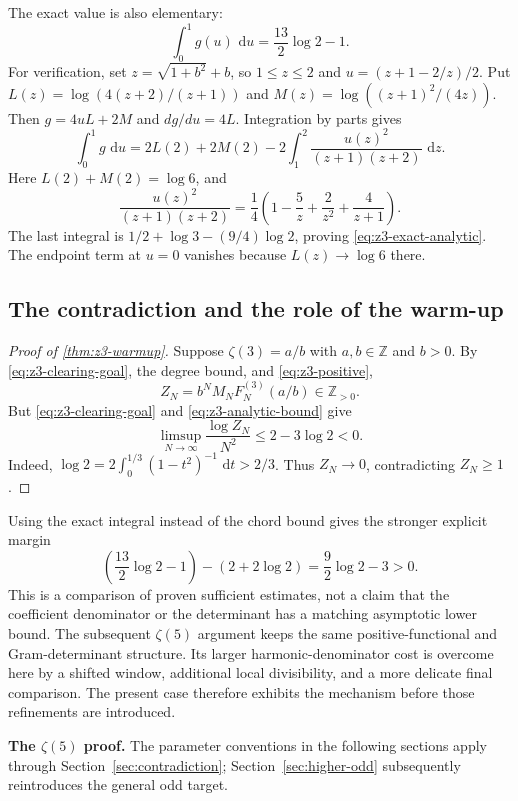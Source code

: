 \documentclass[11pt,letterpaper]{article}
\theoremstyle{definition}
\newcommand{\Z}{\mathbb Z}
\newcommand{\dd}{\,\mathrm d}
\begin{document}
The exact value is also elementary:
\begin{equation}\label{eq:z3-exact-analytic}
 \int_0^1g(u)\,\dd u=\frac{13}{2}\log2-1.
\end{equation}
For verification, set $z=\sqrt{1+b^2}+b$, so $1\le z\le2$ and
$u=(z+1-2/z)/2$. Put
$L(z)=\log(4(z+2)/(z+1))$ and
$M(z)=\log((z+1)^2/(4z))$. Then $g=4uL+2M$ and $dg/du=4L$.
Integration by parts gives
\[
 \int_0^1g\,\dd u
 =2L(2)+2M(2)
 -2\int_1^2\frac{u(z)^2}{(z+1)(z+2)}\,\dd z.
\]
Here $L(2)+M(2)=\log6$, and
\[
 \frac{u(z)^2}{(z+1)(z+2)}
 =\frac14\left(1-\frac5z+\frac2{z^2}+\frac4{z+1}\right).
\]
The last integral is $1/2+\log3-(9/4)\log2$, proving
\eqref{eq:z3-exact-analytic}. The endpoint term at $u=0$ vanishes
because $L(z)\to\log6$ there.

\subsection{The contradiction and the role of the warm-up}

\begin{proof}[Proof of \cref{thm:z3-warmup}]
Suppose $\zeta(3)=a/b$ with $a,b\in\Z$ and $b>0$.
By \eqref{eq:z3-clearing-goal}, the degree bound, and
\eqref{eq:z3-positive},
\[
 Z_N=b^NM_NF_N^{(3)}(a/b)\in\Z_{>0}.
\]
But \eqref{eq:z3-clearing-goal} and \eqref{eq:z3-analytic-bound} give
\[
 \limsup_{N\to\infty}\frac{\log Z_N}{N^2}
 \le2-3\log2<0.
\]
Indeed,
$\log2=2\int_0^{1/3}(1-t^2)^{-1}\,\dd t>2/3$.
Thus $Z_N\to0$, contradicting $Z_N\ge1$.
\end{proof}

Using the exact integral instead of the chord bound gives the stronger
explicit margin
\[
 \left(\frac{13}{2}\log2-1\right)-(2+2\log2)
 =\frac92\log2-3>0.
\]
This is a comparison of proven sufficient estimates, not a claim that
the coefficient denominator or the determinant has a matching
asymptotic lower bound. The subsequent $\zeta(5)$ argument keeps the
same positive-functional and Gram-determinant structure. Its larger
harmonic-denominator cost is overcome here by a shifted window,
additional local divisibility, and a more delicate final comparison. The present
case therefore exhibits the mechanism before those refinements are
introduced.


\medskip\noindent\textbf{The $\zeta(5)$ proof.} The parameter conventions in the following sections apply through Section~\ref{sec:contradiction}; Section~\ref{sec:higher-odd} subsequently reintroduces the general odd target.
\end{document}
